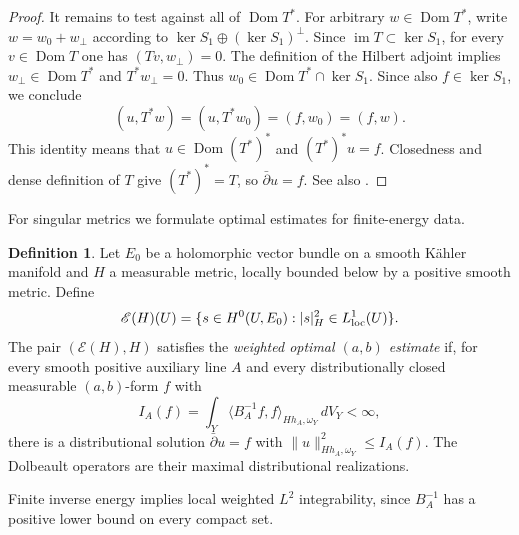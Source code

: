 \documentclass[11pt,reqno]{amsart}
\numberwithin{equation}{section}
\theoremstyle{definition}
\newtheorem{definition}[theorem]{Definition}
\theoremstyle{remark}
\begin{document}
\begin{proof}
It remains to test against all of $\operatorname{Dom}T^*$.
For arbitrary
$w\in\operatorname{Dom}T^*$, write $w=w_0+w_\perp$ according to
$\ker S_1\oplus(\ker S_1)^\perp$.  Since $\operatorname{im}T\subset
\ker S_1$, for every $v\in\operatorname{Dom}T$ one has
$(Tv,w_\perp)=0$.  The definition of the Hilbert adjoint implies
$w_\perp\in\operatorname{Dom}T^*$ and $T^*w_\perp=0$.
Thus $w_0\in\operatorname{Dom}T^*\cap\ker S_1$.  Since also
$f\in\ker S_1$, we conclude
\[
 (u,T^*w)=(u,T^*w_0)=(f,w_0)=(f,w).
\]
This identity means that $u\in\operatorname{Dom}(T^*)^*$ and
$(T^*)^*u=f$.  Closedness and dense definition of $T$ give
$(T^*)^*=T$, so $\bar\partial u=f$.  See also
\cite[Chapters 4--5]{Dem12}.
\end{proof}

For singular metrics we formulate optimal estimates for finite-energy data.
\begin{definition}\label{def:singular-estimate}
Let $E_0$ be a holomorphic vector bundle on a smooth K\"ahler manifold
and $H$ a measurable metric, locally bounded below by a positive
smooth metric.  Define
\[
 \mathscr E(H)(U)=\{s\in H^0(U,E_0):|s|_H^2\in L^1_{\rm loc}(U)\}.
\]
The pair $(\mathscr E(H),H)$ satisfies the \emph{weighted optimal
$(a,b)$ estimate} if, for every smooth positive auxiliary line $A$
and every distributionally closed measurable $(a,b)$-form $f$ with
\[
 I_A(f)=\int_Y\langle B_A^{-1}f,f\rangle_{Hh_A,\omega_Y}\,dV_Y<\infty,
\]
there is a distributional solution $\bar\partial u=f$ with
$\|u\|_{Hh_A,\omega_Y}^2\le I_A(f)$.  The Dolbeault operators are
their maximal distributional realizations.
\end{definition}
Finite inverse energy implies local weighted $L^2$ integrability,
since $B_A^{-1}$ has a positive lower bound on every compact set.
\end{document}
